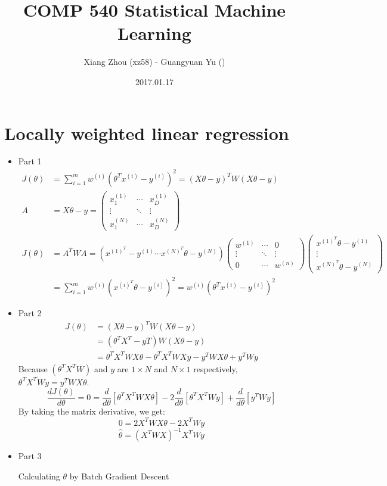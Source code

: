 \documentclass[pdftex,11pt]{article}
\begin{document}
\title{COMP 540 Statistical Machine Learning}
\author{Xiang Zhou (xz58) - Guangyuan Yu ()}
\date{2017.01.17}
\maketitle
\newcommand{\pr}{\mathbb{P}}

\section{Locally weighted linear regression}
\begin{itemize}
\item Part 1 \begin{align*}
	J(\theta)&=\sum^m_{i=1}w^{(i)}(\theta^Tx^{(i)}-y^{(i)})^2=(X\theta-y)^TW(X\theta-y)\\
	A&=X\theta-y=
	\begin{pmatrix}
		x_1^{(1)} & \cdots & x_D^{(1)}\\
		\vdots & \ddots & \vdots\\
		x_1^{(N)} & \cdots & x_D^{(N)}
	\end{pmatrix}\\
	J(\theta)&=A^TWA=(x^{(1)^T}-y^{(1)}\cdots x^{(N)^T}\theta-y^{(N)})
	\begin{pmatrix}
		w^{(1)} & \cdots & 0\\
		\vdots & \ddots & \vdots\\
		0 & \cdots & w^{(n)}
	\end{pmatrix}
	\begin{pmatrix}
		x^{(1)^T}\theta-y^{(1)}\\
		\vdots\\
		x^{(N)^T}\theta-y^{(N)}
	\end{pmatrix}\\
	&=\sum^m_{i=1}w^{(i)}(x^{(i)^T}\theta-y^{(i)})^2=w^{(i)}(\theta^Tx^{(i)}-y^{(i)})^2
	\end{align*}
\item Part 2 \begin{align*}
	J(\theta)&=(X\theta-y)^TW(X\theta-y)\\
	&=(\theta^TX^T-yT)W(X\theta-y)\\
	&=\theta^TX^TWX\theta-\theta^TX^TWXy-y^TWX\theta+y^TWy
	\end{align*}
	Because $(\theta^TX^TW)$ and $y$ are $1\times N$ and $N\times 1$ respectively, $\theta^TX^TWy=y^TWX\theta$.
	$$\frac{dJ(\theta)}{d\theta}=0=\frac{d}{d\theta}[\theta^TX^TWX\theta]-2\frac{d}{d\theta}[\theta^TX^TWy]+\frac{d}{d\theta}[y^TWy]$$
	By taking the matrix derivative, we get:
	$$0=2X^TWX\theta-2X^TWy$$
	$$\hat{\theta}=(X^TWX)^{-1}X^TWy$$
\item Part 3
\begin{algorithm}
  \caption{Calculating $\theta$ by Batch Gradient Descent}


\end{algorithm}
\end{itemize}
\end{document}

